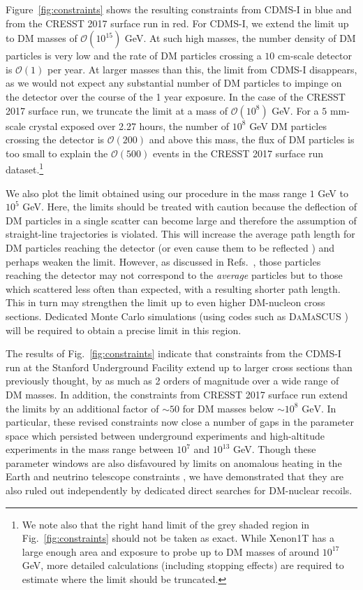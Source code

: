 \documentclass[prd,twocolumn,showpacs,nofootinbib,aps]{revtex4-1}
\begin{document}
Figure~\ref{fig:constraints} shows the resulting constraints from CDMS-I in blue and from the CRESST 2017 surface run in red.  For CDMS-I, we extend the limit up to DM masses of $\mathcal{O}(10^{15})$ GeV. At such high masses, the number density of DM particles is very low and the rate of DM particles crossing a $10 \,\,\mathrm{cm}$-scale detector is $\mathcal{O}(1)$ per year. At larger masses than this, the limit from CDMS-I disappears, as we would not expect any substantial number of DM particles to impinge on the detector over the course of the 1 year exposure. In the case of the CRESST 2017 surface run, we truncate the limit at a mass of $\mathcal{O}(10^{8})$ GeV. For a $5 \,\,\mathrm{mm}$-scale crystal exposed over 2.27 hours, the number of $10^{8}$ GeV DM particles crossing the detector is $\mathcal{O}(200)$ and above this mass, the flux of DM particles is too small to explain the $\mathcal{O}(500)$ events in the CRESST 2017 surface run dataset.\footnote{We note also that the right hand limit of the grey shaded region in Fig.~\ref{fig:constraints} should not be taken as exact. While Xenon1T has a large enough area and exposure to probe up to DM masses  of around $10^{17}$ GeV, more detailed calculations (including stopping effects) are required to estimate where the limit should be truncated.}

We also plot the limit obtained using our procedure in the mass range $1$ GeV to $10^5$ GeV. Here, the limits should be treated with caution because the deflection of DM particles in a single scatter can become large and therefore the assumption of straight-line trajectories is violated. This will increase the average path length for DM particles reaching the detector (or even cause them to be reflected \cite{Kavanagh:2016pyr}) and perhaps weaken the limit. However, as discussed in Refs.~\cite{Mahdawi:2017cxz,Mahdawi:2017utm}, those particles reaching the detector may not correspond to the \textit{average} particles but to those which scattered less often than expected, with a resulting shorter path length. This in turn may strengthen the limit up to even higher DM-nucleon cross sections. Dedicated Monte Carlo simulations (using codes such as \textsc{DaMaSCUS} \cite{Emken2017a, Emken:2017qmp}) will be required to obtain a precise limit in this region.

The results of Fig.~\ref{fig:constraints} indicate that constraints from the CDMS-I run at the Stanford Underground Facility extend up to larger cross sections than previously thought, by as much as 2 orders of magnitude over a wide range of DM masses. In addition, the constraints from CRESST 2017 surface run extend the limits by an additional factor of $\sim50$ for DM masses below $\sim 10^{8}\,\,\mathrm{GeV}$. In particular, these revised constraints now close a number of gaps in the parameter space which persisted between underground experiments and high-altitude experiments in the mass range between $10^7$ and $10^{13}$ GeV. Though these parameter windows are also disfavoured by limits on anomalous heating in the Earth \cite{Mack:2007xj,Mack2013} and neutrino telescope constraints \cite{Albuquerque:2010bt}, we have demonstrated that they are also ruled out independently by dedicated direct searches for DM-nuclear recoils.
\end{document}
